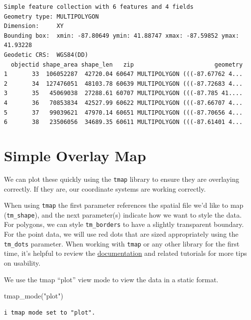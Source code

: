 \documentclass[
  letterpaper,
  DIV=11,
  numbers=noendperiod]{scrreprt}
\newenvironment{Shaded}{\begin{snugshade}}{\end{snugshade}}
\newcommand{\FunctionTok}[1]{\textcolor[rgb]{0.28,0.35,0.67}{#1}}
\newcommand{\NormalTok}[1]{\textcolor[rgb]{0.00,0.23,0.31}{#1}}
\newcommand{\StringTok}[1]{\textcolor[rgb]{0.13,0.47,0.30}{#1}}
\begin{document}
\begin{verbatim}
Simple feature collection with 6 features and 4 fields
Geometry type: MULTIPOLYGON
Dimension:     XY
Bounding box:  xmin: -87.80649 ymin: 41.88747 xmax: -87.59852 ymax: 41.93228
Geodetic CRS:  WGS84(DD)
  objectid shape_area shape_len   zip                       geometry
1       33  106052287  42720.04 60647 MULTIPOLYGON (((-87.67762 4...
2       34  127476051  48103.78 60639 MULTIPOLYGON (((-87.72683 4...
3       35   45069038  27288.61 60707 MULTIPOLYGON (((-87.785 41....
4       36   70853834  42527.99 60622 MULTIPOLYGON (((-87.66707 4...
5       37   99039621  47970.14 60651 MULTIPOLYGON (((-87.70656 4...
6       38   23506056  34689.35 60611 MULTIPOLYGON (((-87.61401 4...
\end{verbatim}

\section{Simple Overlay Map}\label{simple-overlay-map}

We can plot these quickly using the \texttt{tmap} library to ensure they
are overlaying correctly. If they are, our coordinate systems are
working correctly.

When using \texttt{tmap} the first parameter references the spatial file
we'd like to map (\texttt{tm\_shape}), and the next parameter(s)
indicate how we want to style the data. For polygons, we can style
\texttt{tm\_borders} to have a slightly transparent boundary. For the
point data, we will use red dots that are sized appropriately using the
\texttt{tm\_dots} parameter. When working with \texttt{tmap} or any
other library for the first time, it's helpful to review the
\href{}{documentation} and related tutorials for more tips on usability.

We use the tmap ``plot'' view mode to view the data in a static format.

\begin{Shaded}
\begin{Highlighting}[]
\FunctionTok{tmap\_mode}\NormalTok{(}\StringTok{"plot"}\NormalTok{)}
\end{Highlighting}
\end{Shaded}

\begin{verbatim}
i tmap mode set to "plot".
\end{verbatim}
\end{document}

